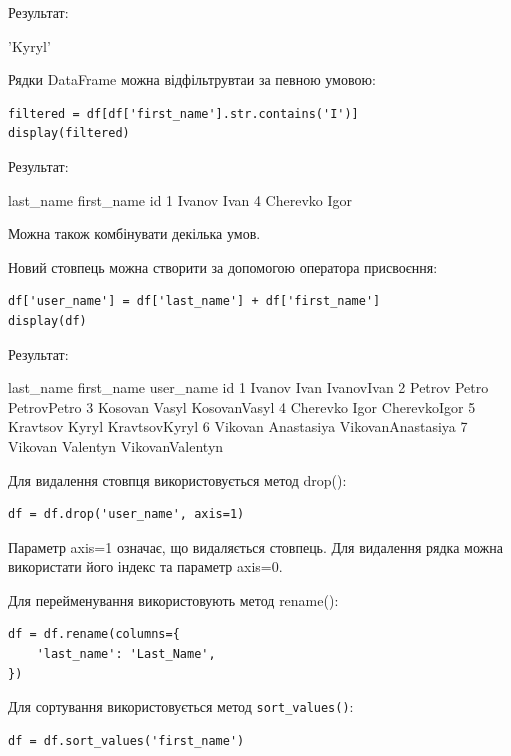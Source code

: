 Результат:

\begin{console}
'Kyryl'
\end{console}

Рядки DataFrame можна відфільтрувтаи за певною умовою:

\begin{lstlisting}
filtered = df[df['first_name'].str.contains('I')]
display(filtered)
\end{lstlisting}

Результат:

\begin{console}
	last_name	first_name
id		
1	Ivanov	Ivan
4	Cherevko	Igor
\end{console}

Можна також комбінувати декілька умов.

Новий стовпець можна створити за допомогою оператора присвоєння:

\begin{lstlisting}
df['user_name'] = df['last_name'] + df['first_name']
display(df)
\end{lstlisting}

Результат:

\begin{console}
	last_name	first_name	user_name
id			
1	Ivanov	Ivan	IvanovIvan
2	Petrov	Petro	PetrovPetro
3	Kosovan	Vasyl	KosovanVasyl
4	Cherevko	Igor	CherevkoIgor
5	Kravtsov	Kyryl	KravtsovKyryl
6	Vikovan	Anastasiya	VikovanAnastasiya
7	Vikovan	Valentyn	VikovanValentyn
\end{console}

Для видалення стовпця використовується метод drop():

\begin{lstlisting}
df = df.drop('user_name', axis=1)
\end{lstlisting}

Параметр axis=1 означає, що видаляється стовпець. Для видалення рядка можна використати його індекс та параметр axis=0.

Для перейменування використовують метод rename():

\begin{lstlisting}
df = df.rename(columns={
    'last_name': 'Last_Name',
})
\end{lstlisting}

Для сортування використовується метод \verb|sort_values()|:

\begin{lstlisting}
df = df.sort_values('first_name')
\end{lstlisting}

